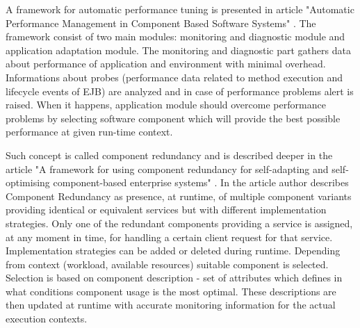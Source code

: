 \documentclass[10pt,a4paper]{article}
\begin{document}
A framework for automatic performance tuning is presented in article "Automatic Performance Management in Component Based Software Systems" \cite{autoframework}. The framework consist of two main modules: monitoring and diagnostic module and application adaptation module. The monitoring and diagnostic part gathers data about performance of application and environment with minimal overhead. Informations about probes (performance data related to method execution and lifecycle
events of EJB) are analyzed and in case of performance problems alert is raised. When it happens, application module should overcome performance problems by selecting software component which will provide the best possible performance at given run-time context. 

Such concept is called component redundancy and is described deeper in the article "A framework for using component redundancy for self-adapting and self-optimising component-based enterprise systems" \cite{redundancycomponent}. In the article author describes Component Redundancy as presence, at runtime, of multiple  component  variants  providing  identical or equivalent services but with different implementation strategies. Only one of the redundant components providing a service is assigned, at any moment in time, for handling a certain client request for that  service.  Implementation strategies can be added or deleted during runtime. Depending from context (workload, available resources) suitable component is selected. Selection is based on component description - set of attributes which defines in what conditions component usage is the most optimal. These descriptions are then updated at runtime with accurate monitoring information for the actual execution contexts. 
\end{document}
